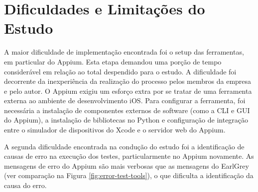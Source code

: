 \section{Dificuldades e Limitações do Estudo}
A maior dificuldade de implementação encontrada foi o setup das ferramentas, em particular do Appium. Esta etapa demandou uma porção de tempo considerável em relação ao total despendido para o estudo. A dificuldade foi decorrente da inexperiência da realização do processo pelos membros da empresa e pelo autor. O Appium exigiu um esforço extra por se tratar de uma ferramenta externa ao ambiente de desenvolvimento iOS. Para configurar a ferramenta, foi necessária a instalação de componentes externos de software (como a CLI e GUI do Appium), a instalação de bibliotecas no Python e configuração de integração entre o simulador de dispositivos do Xcode e o servidor web do Appium.

A segunda dificuldade encontrada na condução do estudo foi a identificação de causas de erro na execução dos testes, particularmente no Appium novamente. As mensagens de erro do Appium são mais verbosas que as mensagens do EarlGrey (ver comparação na Figura \ref{fig:error-test-tools}), o que dificulta a identificação da causa do erro.

